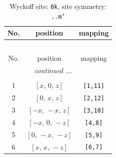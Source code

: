 \documentclass[fleqn,8pt]{jsarticle}
\begin{document}
\renewcommand{\arraystretch}{1.2}
\begin{longtable}{ccc}
\caption{Wyckoff site: {\tt 6k}, site symmetry: {\tt ..m'}}
 \\
 \hline \hline
No. & position & mapping \\ \hline \endfirsthead

\multicolumn{2}{l}{\tablename\ \thetable{}} \\
 \hline \hline
No. & position & mapping \\ \hline \endhead

 \hline \hline
\multicolumn{2}{r}{\footnotesize\it continued ...} \\ \endfoot

 \hline \hline
\multicolumn{2}{r}{} \\ \endlastfoot

1 & $\left[ x,\, 0,\, z \right]$ & {\tt [1,11]} \\ \hline
2 & $\left[ 0,\, x,\, z \right]$ & {\tt [2,12]} \\ \hline
3 & $\left[ - x,\, - x,\, z \right]$ & {\tt [3,10]} \\ \hline
4 & $\left[ - x,\, 0,\, - z \right]$ & {\tt [4,8]} \\ \hline
5 & $\left[ 0,\, - x,\, - z \right]$ & {\tt [5,9]} \\ \hline
6 & $\left[ x,\, x,\, - z \right]$ & {\tt [6,7]} \\
\end{longtable}
\renewcommand{\arraystretch}{1.2}
\end{document}
